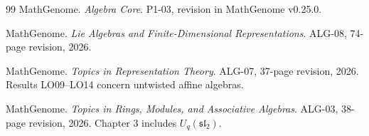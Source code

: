 \documentclass[11pt,oneside,openany]{book}
\theoremstyle{definition}
\theoremstyle{remark}
\begin{document}
\begin{thebibliography}{99}
MathGenome.
\emph{Algebra Core}. P1-03, revision in MathGenome v0.25.0.

MathGenome.
\emph{Lie Algebras and Finite-Dimensional Representations}.
ALG-08, 74-page revision, 2026.

MathGenome.
\emph{Topics in Representation Theory}.
ALG-07, 37-page revision, 2026. Results LO09--LO14 concern untwisted affine algebras.

MathGenome.
\emph{Topics in Rings, Modules, and Associative Algebras}.
ALG-03, 38-page revision, 2026. Chapter 3 includes \(U_q(\mathfrak{sl}_2)\).

\end{thebibliography}
\endgroup
\end{document}

